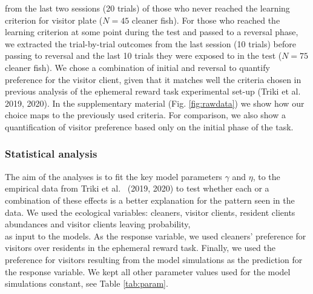 \documentclass[
  12pt,
]{article}
\begin{document}
from the last two sessions (20 trials) of those who never reached the
learning criterion for visitor plate (\(N = 45\) cleaner fish). For
those who reached the learning criterion at some point during the test
and passed to a reversal phase, we extracted the trial-by-trial outcomes
from the last session (10 trials) before passing to reversal and the
last 10 trials they were exposed to in the test (\(N = 75\) cleaner
fish). We chose a combination of initial and reversal to quantify
preference for the visitor client, given that it matches well the
criteria chosen in previous analysis of the ephemeral reward task
experimental set-up (Triki et al. 2019, 2020). In the supplementary
material (Fig. \ref{fig:rawdata}) we show how our choice maps to the
previously used criteria. For comparison, we also show a quantification
of visitor preference based only on the initial phase of the task.

\hypertarget{statistical-analysis}{%
\subsubsection{Statistical analysis}\label{statistical-analysis}}

The aim of the analyses is to fit the key model parameters \(\gamma\)
and \(\eta\), to the empirical data from Triki et al.~ (2019, 2020) to
test whether each or a combination of these effects is a better
explanation for the pattern seen in the data. We used the ecological
variables: cleaners, visitor clients, resident clients abundances and
visitor clients leaving probability,\\
as input to the models. As the response variable, we used cleaners'
preference for visitors over residents in the ephemeral reward task.
Finally, we used the preference for visitors resulting from the model
simulations as the prediction for the response variable. We kept all
other parameter values used for the model simulations constant, see
Table \ref{tab:param}.
\end{document}
